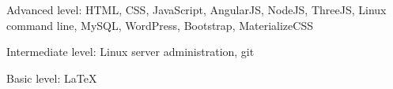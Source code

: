 \cventry{}
    {Advanced level:}
    {}
    {HTML, CSS, JavaScript, AngularJS, NodeJS, ThreeJS, Linux command line, MySQL, WordPress, Bootstrap, MaterializeCSS}
    {}
    {}

\cventry{}
    {Intermediate level:}
    {}
    {Linux server administration, git}
    {}
    {}

\cventry{}
    {Basic level:}
    {}
    {\LaTeX}
    {}
    {}
